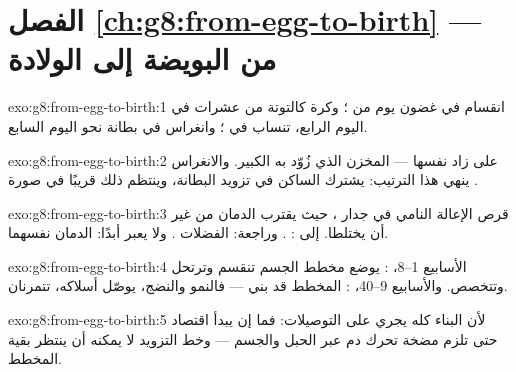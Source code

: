 \section*{الفصل \ref{ch:g8:from-egg-to-birth} --- من البويضة إلى الولادة}

\begin{solution}{exo:g8:from-egg-to-birth:1}
انقسام في غضون يوم من ؛ وكرة كالتوتة من عشرات
 في اليوم الرابع، تنساب في ؛ وانغراس في
بطانة  نحو اليوم السابع.
\end{solution}

\begin{solution}{exo:g8:from-egg-to-birth:2}
على زاد  نفسها --- المخزن الذي زُوّد به 
الكبير. والانغراس ينهي هذا الترتيب: يشترك الساكن في
تزويد البطانة، وينتظم ذلك قريبًا في صورة .
\end{solution}

\begin{solution}{exo:g8:from-egg-to-birth:3}
قرص الإعالة النامي في جدار ، حيث يقترب الدمان من
غير أن يختلطا. إلى :  . وراجعة:
الفضلات . ولا يعبر أبدًا: الدمان
نفسهما.
\end{solution}

\begin{solution}{exo:g8:from-egg-to-birth:4}
الأسابيع 1--8، : يوضع مخطط الجسم  تنقسم
وترتحل وتتخصص. والأسابيع 9--40، : المخطط قد بني ---
فالنمو والنضج،  يوصّل أسلاكه،  تتمرنان.
\end{solution}

\begin{solution}{exo:g8:from-egg-to-birth:5}
لأن البناء كله يجري على التوصيلات: فما إن يبدأ اقتصاد
 حتى تلزم مضخة تحرك دم  عبر الحبل والجسم ---
وخط التزويد لا يمكنه أن ينتظر بقية المخطط.
\end{solution}

